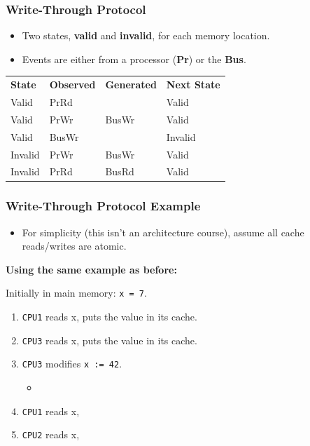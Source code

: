\begin{frame}
  \frametitle{Write-Through Protocol}
\Large
  
  \begin{itemize}
    \item Two states, {\bf valid} and {\bf invalid}, for each memory location.
    \item Events are either from a processor ({\bf Pr}) or the {\bf Bus}.
  \end{itemize}
  \vfill
  \begin{center}
    \begin{tabular}{llll}
      {\bf State} & {\bf Observed} & {\bf Generated} & {\bf Next State}\\
      Valid   & PrRd  &       & Valid\\
      Valid   & PrWr  & BusWr & Valid\\
      Valid   & BusWr &       & Invalid\\
      Invalid & PrWr  & BusWr & Valid\\
      Invalid & PrRd  & BusRd & Valid\\
    \end{tabular}
  \end{center}
  
\end{frame}

\begin{frame}
  \frametitle{Write-Through Protocol Example}
\large
  

  \begin{itemize}
    \item For simplicity (this isn't an architecture course), assume all cache
      reads/writes are atomic.
  \end{itemize}
  \vfill
  {\bf Using the same example as before:}

  Initially in main memory: {\tt x = 7}.

  \begin{enumerate}
    \item {\tt CPU1} reads x, puts the value in its cache. 
    \item {\tt CPU3} reads x, puts the value in its cache. 
    \item {\tt CPU3} modifies {\tt x := 42}. 
      \begin{itemize}
        \item {}
      \end{itemize}
    \item {\tt CPU1} reads x, 
    \item {\tt CPU2} reads x, 
  \end{enumerate}
  
\end{frame}

